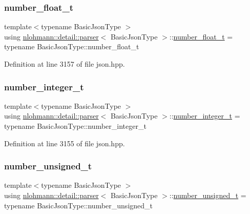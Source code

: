 \subsubsection{\texorpdfstring{number\+\_\+float\+\_\+t}{number\_float\_t}}
{\footnotesize\ttfamily template$<$typename Basic\+Json\+Type $>$ \\
using \hyperlink{classnlohmann_1_1detail_1_1parser}{nlohmann\+::detail\+::parser}$<$ Basic\+Json\+Type $>$\+::\hyperlink{classnlohmann_1_1detail_1_1parser_a8ca8e734da0632c2731fc3b9547dcf28}{number\+\_\+float\+\_\+t} =  typename Basic\+Json\+Type\+::number\+\_\+float\+\_\+t\hspace{0.3cm}{\ttfamily [private]}}



Definition at line 3157 of file json.\+hpp.

\mbox{\label{classnlohmann_1_1detail_1_1parser_aa0362897269e0a7e50ae07be05f42d8e}} 
\subsubsection{\texorpdfstring{number\+\_\+integer\+\_\+t}{number\_integer\_t}}
{\footnotesize\ttfamily template$<$typename Basic\+Json\+Type $>$ \\
using \hyperlink{classnlohmann_1_1detail_1_1parser}{nlohmann\+::detail\+::parser}$<$ Basic\+Json\+Type $>$\+::\hyperlink{classnlohmann_1_1detail_1_1parser_aa0362897269e0a7e50ae07be05f42d8e}{number\+\_\+integer\+\_\+t} =  typename Basic\+Json\+Type\+::number\+\_\+integer\+\_\+t\hspace{0.3cm}{\ttfamily [private]}}



Definition at line 3155 of file json.\+hpp.

\mbox{\label{classnlohmann_1_1detail_1_1parser_a3773ccef366c61da2e6a8c0eda36d0ec}} 
\subsubsection{\texorpdfstring{number\+\_\+unsigned\+\_\+t}{number\_unsigned\_t}}
{\footnotesize\ttfamily template$<$typename Basic\+Json\+Type $>$ \\
using \hyperlink{classnlohmann_1_1detail_1_1parser}{nlohmann\+::detail\+::parser}$<$ Basic\+Json\+Type $>$\+::\hyperlink{classnlohmann_1_1detail_1_1parser_a3773ccef366c61da2e6a8c0eda36d0ec}{number\+\_\+unsigned\+\_\+t} =  typename Basic\+Json\+Type\+::number\+\_\+unsigned\+\_\+t\hspace{0.3cm}{\ttfamily [private]}}



